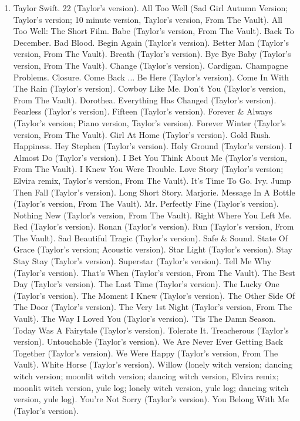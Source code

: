 \documentclass{article}
\begin{document}
\begin{enumerate}
	\item {\sc Taylor Swift.} 22 (Taylor's version). All Too Well (Sad Girl Autumn Version; Taylor's version; 10 minute version, Taylor's version, From The Vault). All Too Well: The Short Film. Babe (Taylor's version, From The Vault). Back To December. Bad Blood. Begin Again (Taylor's version). Better Man (Taylor's version, From The Vault). Breath (Taylor's version). Bye Bye Baby (Taylor's version, From The Vault). Change (Taylor's version). Cardigan. Champagne Problems. Closure. Come Back $\ldots$ Be Here (Taylor's version). Come In With The Rain (Taylor's version). Cowboy Like Me. Don't You (Taylor's version, From The Vault). Dorothea. Everything Has Changed (Taylor's version). Fearless (Taylor's version). Fifteen (Taylor's version). Forever \& Always (Taylor's version; Piano version, Taylor's version). Forever Winter (Taylor's version, From The Vault). Girl At Home (Taylor's version). Gold Rush. Happiness. Hey Stephen (Taylor's version). Holy Ground (Taylor's version). I Almost Do (Taylor's version). I Bet You Think About Me (Taylor's version, From The Vault). I Knew You Were Trouble. Love Story (Taylor's version; Elvira remix, Taylor's version, From The Vault). It's Time To Go. Ivy. Jump Then Fall (Taylor's version). Long Short Story. Marjorie. Message In A Bottle (Taylor's version, From The Vault). Mr. Perfectly Fine (Taylor's version). Nothing New (Taylor's version, From The Vault). Right Where You Left Me. Red (Taylor's version). Ronan (Taylor's version). Run (Taylor's version, From The Vault). Sad Beautiful Tragic (Taylor's version). Safe \& Sound. State Of Grace (Taylor's version; Acoustic version). Star Light (Taylor's version). Stay Stay Stay (Taylor's version). Superstar (Taylor's version). Tell Me Why (Taylor's version). That's When (Taylor's version, From The Vault). The Best Day (Taylor's version). The Last Time (Taylor's version). The Lucky One (Taylor's version). The Moment I Knew (Taylor's version). The Other Side Of The Door (Taylor's version). The Very 1st Night (Taylor's version, From The Vault). The Way I Loved You (Taylor's version). 'Tis The Damn Season. Today Was A Fairytale (Taylor's version). Tolerate It. Treacherous (Taylor's version). Untouchable (Taylor's version). We Are Never Ever Getting Back Together (Taylor's version). We Were Happy (Taylor's version, From The Vault). White Horse (Taylor's version). Willow (lonely witch version; dancing witch version; moonlit witch version; dancing witch version, Elvira remix; moonlit witch version, yule log; lonely witch version, yule log; dancing witch version, yule log). You're Not Sorry (Taylor's version). You Belong With Me (Taylor's version).

\end{enumerate}
\end{document}
